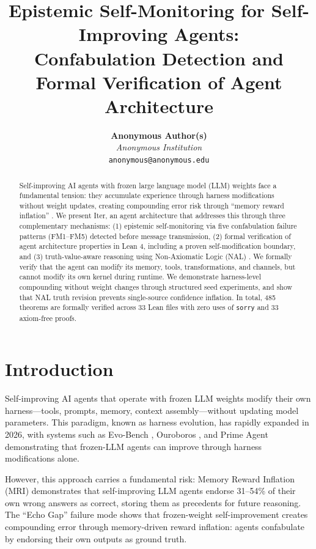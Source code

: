 \documentclass{article}
\title{Epistemic Self-Monitoring for Self-Improving Agents: \\
Confabulation Detection and Formal Verification of Agent Architecture}
\author{
  \textbf{Anonymous Author(s)} \\
  \textit{Anonymous Institution} \\
  \texttt{anonymous@anonymous.edu}
}
\begin{document}
\maketitle

\begin{abstract}
Self-improving AI agents with frozen large language model (LLM) weights face a fundamental tension: they accumulate experience through harness modifications without weight updates, creating compounding error risk through ``memory reward inflation'' \citep{mri}. We present Iter, an agent architecture that addresses this through three complementary mechanisms: (1) epistemic self-monitoring via five confabulation failure patterns (FM1--FM5) detected before message transmission, (2) formal verification of agent architecture properties in Lean 4, including a proven self-modification boundary, and (3) truth-value-aware reasoning using Non-Axiomatic Logic (NAL) \citep{wang1995}. We formally verify that the agent can modify its memory, tools, transformations, and channels, but cannot modify its own kernel during runtime. We demonstrate harness-level compounding without weight changes through structured seed experiments, and show that NAL truth revision prevents single-source confidence inflation. In total, 485 theorems are formally verified across 33 Lean files with zero uses of \texttt{sorry} and 33 axiom-free proofs.
\end{abstract}

\section{Introduction}
\label{sec:intro}

Self-improving AI agents that operate with frozen LLM weights modify their own harness—tools, prompts, memory, context assembly—without updating model parameters. This paradigm, known as harness evolution, has rapidly expanded in 2026, with systems such as Evo-Bench \citep{evobench}, Ouroboros \citep{ouroboros}, and Prime Agent \citep{primeagent} demonstrating that frozen-LLM agents can improve through harness modifications alone.

However, this approach carries a fundamental risk: Memory Reward Inflation (MRI) \citep{mri} demonstrates that self-improving LLM agents endorse 31--54\% of their own wrong answers as correct, storing them as precedents for future reasoning. The ``Echo Gap'' failure mode shows that frozen-weight self-improvement creates compounding error through memory-driven reward inflation: agents confabulate by endorsing their own outputs as ground truth.
\end{document}
